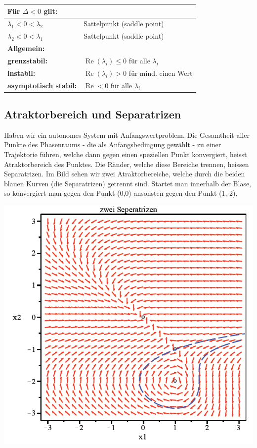 \begin{longtable}{|p{}|p{}|}
	\multicolumn{2}{l}{Für $\Delta < 0$ gilt:} \\
	
	\hline $\lambda_1 < 0 < \lambda_2$ & Sattelpunkt (saddle point) \\
	\hline $\lambda_2 < 0 < \lambda_1$ & Sattelpunkt (saddle point) \\
	\hline
	
	\multicolumn{2}{l}{\textbf{Allgemein:}}\\
	
	\hline
	\textbf{grenzstabil:} & $\operatorname{Re}(\lambda_i) \leq 0$ für alle $\lambda_i$ \\
	\textbf{instabil:} & $\operatorname{Re}(\lambda_i) > 0$ für mind. einen Wert \\
	\textbf{asymptotisch stabil:} &$\operatorname{Re} < 0$ für alle $\lambda_i$ \\
	\hline
\end{longtable}

\subsection{Atraktorbereich und Separatrizen}
Haben wir ein autonomes System mit Anfangswertproblem. Die Gesamtheit aller Punkte des Phasenraums - die als Anfangsbedingung gewählt - zu einer Trajektorie führen, welche dann gegen einen speziellen Punkt konvergiert, heisst Atraktorbereich des Punktes. 
Die Ränder, welche diese Bereiche trennen, heissen Separatrizen. 
Im Bild sehen wir zwei Atraktorbereiche, welche durch die beiden blauen Kurven (die Separatrizen) getrennt sind. 
Startet man innerhalb der Blase, so konvergiert man gegen den Punkt (0,0) ansonsten gegen den Punkt (1,-2). 
\begin{minipage}[h!]{0.35\textwidth}
	\includegraphics[width=1\textwidth]{images/Atraktorbereich.png}
\end{minipage}

